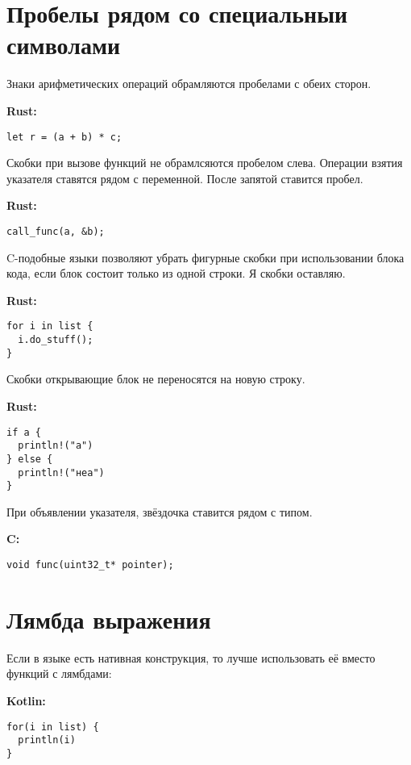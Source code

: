 \documentclass[12p]{article}
\begin{document}
\section{Пробелы рядом со специальныи символами}

Знаки арифметических операций обрамляются пробелами с обеих сторон.\newline

\textbf{Rust:}
\begin{verbatim}
let r = (a + b) * c;
\end{verbatim}

Скобки при вызове функций не обрамлсяются пробелом слева. Операции взятия указателя ставятся рядом с переменной. После запятой ставится пробел.\newline

\textbf{Rust:}
\begin{verbatim}
call_func(a, &b);
\end{verbatim}

C-подобные языки позволяют убрать фигурные скобки при использовании блока кода, если блок состоит только из одной строки. Я скобки оставляю.\newline

\textbf{Rust:}
\begin{verbatim}
for i in list {
  i.do_stuff();
}
\end{verbatim}

Скобки открывающие блок не переносятся на новую строку.\newline

\textbf{Rust:}
\begin{verbatim}
if a {
  println!("а")
} else {
  println!("неа")
}
\end{verbatim}
\pagebreak

При объявлении указателя, звёздочка ставится рядом с типом.\newline

\textbf{C:}
\begin{verbatim}
void func(uint32_t* pointer);
\end{verbatim}

\section{Лямбда выражения}

Если в языке есть нативная конструкция, то лучше использовать её вместо функций с лямбдами:\newline

\textbf{Kotlin:}
\begin{verbatim}
for(i in list) {
  println(i)
}
\end{verbatim}
\end{document}

